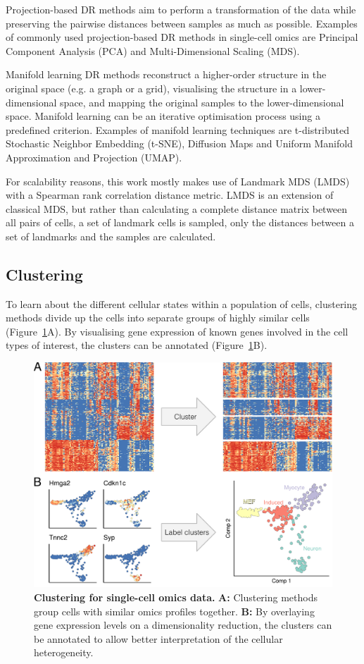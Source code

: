 Projection-based DR methods aim to perform a transformation of the data while preserving the pairwise distances between samples as much as possible. Examples of commonly used projection-based DR methods in single-cell omics are Principal Component Analysis \cite{pearson_liiilinesplanes_1901} (PCA) and Multi-Dimensional Scaling \cite{kruskal_multidimensionalscalingoptimizing_1964} (MDS). 

Manifold learning DR methods reconstruct a higher-order structure in the original space (e.g. a graph or a grid), visualising the structure in a lower-dimensional space, and mapping the original samples to the lower-dimensional space. Manifold learning can be an iterative optimisation process using a predefined criterion. Examples of manifold learning techniques are t-distributed Stochastic Neighbor Embedding \cite{vandermaaten_visualizingdatausing_2008} (t-SNE), Diffusion Maps \cite{nadler_diffusion_2005,coifman_diffusionmaps_2006} and Uniform Manifold Approximation and Projection \cite{mcinnes_umapuniformmanifold_2018} (UMAP). 

For scalability reasons, this work mostly makes use of Landmark MDS \cite{silva_globallocalmethods_2002,lee_landmarkmdsensemble_2009} (LMDS) with a Spearman rank correlation distance metric. LMDS is an extension of classical MDS, but rather than calculating a complete distance matrix between all pairs of cells, a set of landmark cells is sampled, only the distances between a set of landmarks and the samples are calculated. 

\subsection{Clustering}
To learn about the different cellular states within a population of cells, clustering methods divide up the cells into separate groups of highly similar cells (Figure~\ref{fig:comp_tools_cluster}A). 
By visualising gene expression of known genes involved in the cell types of interest, the clusters can be annotated (Figure~\ref{fig:comp_tools_cluster}B). 

\begin{figure}[htb!]
	\centering
	\includegraphics[width=.6\linewidth]{fig/comptools2/comptool_2_clustering.pdf} 
	\caption{
		\textbf{Clustering for single-cell omics data.}
		\textbf{A:} Clustering methods group cells with similar omics profiles together. 
		\textbf{B:} By overlaying gene expression levels on a dimensionality reduction, the clusters can be annotated to allow better interpretation of the cellular heterogeneity.
	}
	\label{fig:comp_tools_cluster}
\end{figure}


